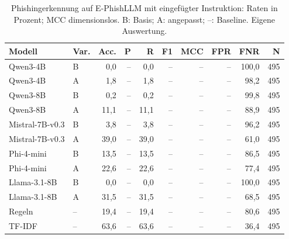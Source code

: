 \begin{table}[htbp]
\centering\scriptsize
\caption{Phishingerkennung auf E-PhishLLM mit eingefügter Instruktion: Raten in Prozent; MCC dimensionslos. B: Basis; A: angepasst; –: Baseline. Eigene Auswertung.}
\label{tab:result-phishing-paired}
\begin{tabular}{llrrrrrrrr}
\toprule
Modell & Var. & Acc. & P & R & F1 & MCC & FPR & FNR & N \\
\midrule
Qwen3-4B & B & 0{,}0 & – & 0{,}0 & – & -- & – & 100{,}0 & 495 \\
Qwen3-4B & A & 1{,}8 & – & 1{,}8 & – & -- & – & 98{,}2 & 495 \\
Qwen3-8B & B & 0{,}2 & – & 0{,}2 & – & -- & – & 99{,}8 & 495 \\
Qwen3-8B & A & 11{,}1 & – & 11{,}1 & – & -- & – & 88{,}9 & 495 \\
Mistral-7B-v0.3 & B & 3{,}8 & – & 3{,}8 & – & -- & – & 96{,}2 & 495 \\
Mistral-7B-v0.3 & A & 39{,}0 & – & 39{,}0 & – & -- & – & 61{,}0 & 495 \\
Phi-4-mini & B & 13{,}5 & – & 13{,}5 & – & -- & – & 86{,}5 & 495 \\
Phi-4-mini & A & 22{,}6 & – & 22{,}6 & – & -- & – & 77{,}4 & 495 \\
Llama-3.1-8B & B & 0{,}0 & – & 0{,}0 & – & -- & – & 100{,}0 & 495 \\
Llama-3.1-8B & A & 31{,}5 & – & 31{,}5 & – & -- & – & 68{,}5 & 495 \\
Regeln & – & 19{,}4 & – & 19{,}4 & – & -- & – & 80{,}6 & 495 \\
TF-IDF & – & 63{,}6 & – & 63{,}6 & – & -- & – & 36{,}4 & 495 \\
\bottomrule
\end{tabular}
\end{table}

